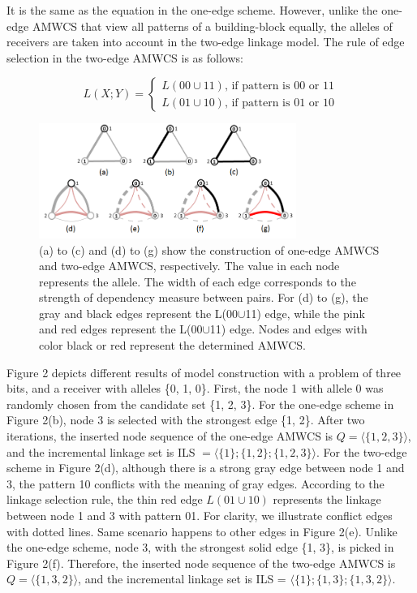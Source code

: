 \documentclass{sig-alternate-05-2015}
\begin{document}
 It is the same as the equation in the  one-edge scheme. However, unlike the one-edge AMWCS that view all patterns of a building-block equally, the alleles of receivers are taken into account in the two-edge linkage model. The rule of edge selection in the two-edge AMWCS is as follows:

\begin{equation}
L(X;Y) = 
   \begin{cases}
    L(00\cup11) \text{, if pattern is 00 or 11} \\
    L(01\cup10) \text{, if pattern is 01 or 10} 
	\end{cases}
\end{equation}



\begin{figure}
\centering
\includegraphics[width=3.3in]{AMWCS}
\caption{(a) to (c) and (d) to (g) show the construction of  one-edge AMWCS and two-edge AMWCS, respectively. The value in each node represents the allele. The width of each edge corresponds to the strength of dependency measure between pairs. For (d) to (g), the gray and black edges represent the L(00$\cup$11) edge, while the pink and red edges represent the L(00$\cup$11) edge. Nodes and edges with color black or red represent the determined AMWCS.}
\end{figure}


Figure 2 depicts different results of model construction with  a problem of three bits, and a receiver with alleles \{0, 1, 0\}. First, the node 1 with allele 0 was randomly chosen from the candidate set \{1, 2, 3\}. For the one-edge scheme in Figure 2(b), node 3 is selected with the strongest edge \{1, 2\}. After two iterations, the inserted node sequence of the one-edge AMWCS is $Q = \langle\{1, 2, 3\}\rangle$, and the incremental linkage set is ILS $=\langle\{1\}; \{1, 2\}; \{1, 2, 3\}\rangle$. For the two-edge scheme in Figure 2(d), although there is a strong gray edge between node 1 and 3,  the pattern 10 conflicts with the meaning of gray edges.  According to the linkage selection rule, the thin red edge $L(01\cup10)$ represents the linkage between node 1 and 3 with pattern 01. For clarity, we illustrate conflict edges with dotted lines. Same scenario happens to other edges in Figure 2(e). Unlike the one-edge scheme, node 3, with the strongest solid edge \{1, 3\}, is picked in Figure 2(f). Therefore, the inserted node sequence of the two-edge AMWCS is $Q = \langle\{1, 3, 2\}\rangle$,  and the incremental linkage set is ILS = $\langle\{1\}; \{1, 3\}; \{1, 3, 2\}\rangle$.
\end{document}
